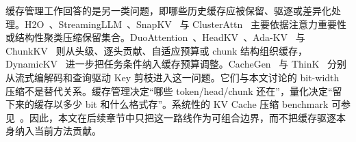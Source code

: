 缓存管理工作回答的是另一类问题，即哪些历史缓存应被保留、驱逐或差异化处理。H2O~\cite{zhang2024h2o}、StreamingLLM~\cite{xiao2024efficient}、SnapKV~\cite{li2024snapkv} 与 ClusterAttn~\cite{zhang2025clusterattn} 主要依据注意力重要性或结构性聚类压缩保留集合。DuoAttention~\cite{xiao2024duoattention}、HeadKV~\cite{fu2025headkv}、Ada-KV~\cite{feng2025adakv} 与 ChunkKV~\cite{liu2025chunkkv} 则从头级、逐头贡献、自适应预算或 chunk 结构组织缓存，DynamicKV~\cite{zhou2025dynamickv} 进一步把任务条件纳入缓存预算调整。CacheGen~\cite{liu2024cachegen} 与 ThinK~\cite{xu2024think} 分别从流式编解码和查询驱动 Key 剪枝进入这一问题。它们与本文讨论的 bit-width 压缩不是替代关系。缓存管理决定“哪些 token/head/chunk 还在”，量化决定“留下来的缓存以多少 bit 和什么格式存”。系统性的 KV Cache 压缩 benchmark 可参见~\cite{yuan2024kvcompressionbench}。因此，本文在后续章节中只把这一路线作为可组合边界，而不把缓存驱逐本身纳入当前方法贡献。

